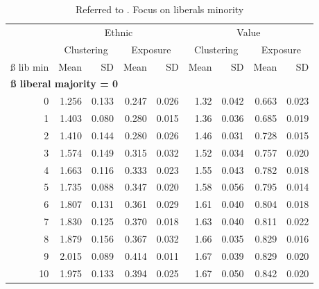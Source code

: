 \documentclass[
]{article}
\begin{document}
\begin{table}

\caption{\label{tab:asm_lib_mint_t}Referred to . Focus on liberals minority}
\centering
\fontsize{9}{11}\selectfont
\begin{tabular}[t]{r|r|r|r|r|r|r|r|r}
\hline
\multicolumn{1}{c|}{ } & \multicolumn{4}{c|}{Ethnic} & \multicolumn{4}{c}{Value} \\
\cline{2-5} \cline{6-9}
\multicolumn{1}{c|}{ } & \multicolumn{2}{c|}{Clustering} & \multicolumn{2}{c|}{Exposure} & \multicolumn{2}{c|}{Clustering} & \multicolumn{2}{c}{Exposure} \\
\cline{2-3} \cline{4-5} \cline{6-7} \cline{8-9}
ß lib min & Mean & SD & Mean & SD & Mean & SD & Mean & SD\\
\hline
\multicolumn{9}{l}{\textbf{ß liberal majority = 0}}\\
\hline
\hspace{1em}0 & 1.256 & 0.133 & 0.247 & 0.026 & 1.32 & 0.042 & 0.663 & 0.023\\
\hline
\hspace{1em}1 & 1.403 & 0.080 & 0.280 & 0.015 & 1.36 & 0.036 & 0.685 & 0.019\\
\hline
\hspace{1em}2 & 1.410 & 0.144 & 0.280 & 0.026 & 1.46 & 0.031 & 0.728 & 0.015\\
\hline
\hspace{1em}3 & 1.574 & 0.149 & 0.315 & 0.032 & 1.52 & 0.034 & 0.757 & 0.020\\
\hline
\hspace{1em}4 & 1.663 & 0.116 & 0.333 & 0.023 & 1.55 & 0.043 & 0.782 & 0.018\\
\hline
\hspace{1em}5 & 1.735 & 0.088 & 0.347 & 0.020 & 1.58 & 0.056 & 0.795 & 0.014\\
\hline
\hspace{1em}6 & 1.807 & 0.131 & 0.361 & 0.029 & 1.61 & 0.040 & 0.804 & 0.018\\
\hline
\hspace{1em}7 & 1.830 & 0.125 & 0.370 & 0.018 & 1.63 & 0.040 & 0.811 & 0.022\\
\hline
\hspace{1em}8 & 1.879 & 0.156 & 0.367 & 0.032 & 1.66 & 0.035 & 0.829 & 0.016\\
\hline
\hspace{1em}9 & 2.015 & 0.089 & 0.414 & 0.011 & 1.67 & 0.039 & 0.829 & 0.020\\
\hline
\hspace{1em}10 & 1.975 & 0.133 & 0.394 & 0.025 & 1.67 & 0.050 & 0.842 & 0.020\\

\end{tabular}
\end{table}
\end{document}

